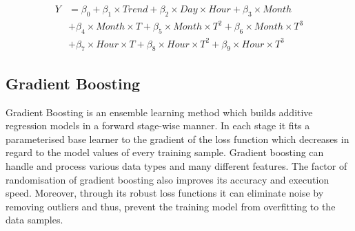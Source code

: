 \documentclass{article} %
\begin{document}
\begin{align*}
Y &= \beta_0 + \beta_1 \times Trend + \beta_2 \times Day \times Hour + \beta_3 \times Month \\
&+ \beta_4 \times Month \times T + \beta_5 \times Month \times T^2 + \beta_6 \times Month \times T^3 \\
&+ \beta_7 \times Hour \times T + \beta_8 \times Hour \times T^2 + \beta_9 \times Hour \times T^3 
\end{align*}



\subsection*{Gradient Boosting}
Gradient Boosting is an ensemble learning method which builds additive regression models in a forward stage-wise manner. In each stage it fits a parameterised base learner to the gradient of the loss function which decreases in regard to the model values of every training sample. Gradient boosting can handle and process various data types and many different features. The factor of randomisation of gradient boosting also improves its accuracy and execution speed. Moreover, through its robust loss functions it can eliminate noise by removing outliers and thus, prevent the training model from overfitting to the data samples.
\end{document}

